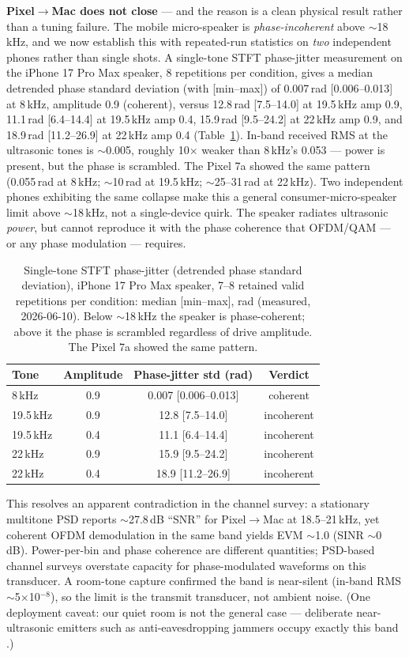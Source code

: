 \documentclass[11pt]{article}
\begin{document}
\textbf{Pixel$\rightarrow$Mac does not close} --- and the reason is a clean
physical result rather than a tuning failure. The mobile micro-speaker is
\emph{phase-incoherent} above $\sim$18\,kHz, and we now establish this with
repeated-run statistics on \emph{two} independent phones rather than single
shots. A single-tone STFT phase-jitter measurement on the iPhone 17 Pro Max
speaker, 8 repetitions per condition, gives a median detrended phase standard
deviation (with [min--max]) of 0.007\,rad [0.006--0.013] at 8\,kHz, amplitude
0.9 (coherent), versus 12.8\,rad [7.5--14.0] at 19.5\,kHz amp 0.9, 11.1\,rad
[6.4--14.4] at 19.5\,kHz amp 0.4, 15.9\,rad [9.5--24.2] at 22\,kHz amp 0.9, and
18.9\,rad [11.2--26.9] at 22\,kHz amp 0.4 (Table~\ref{tab:phase}). In-band
received RMS at the ultrasonic tones is $\sim$0.005, roughly 10$\times$ weaker
than 8\,kHz's 0.053 --- power is present, but the phase is scrambled. The Pixel
7a showed the same pattern (0.055\,rad at 8\,kHz; $\sim$10\,rad at 19.5\,kHz;
$\sim$25--31\,rad at 22\,kHz). Two independent phones exhibiting the same
collapse make this a general consumer-micro-speaker limit above $\sim$18\,kHz,
not a single-device quirk. The speaker radiates ultrasonic \emph{power}, but
cannot reproduce it with the phase coherence that OFDM/QAM --- or any phase
modulation --- requires.

\begin{table}[t]
\centering
\caption{Single-tone STFT phase-jitter (detrended phase standard deviation),
iPhone 17 Pro Max speaker, 7--8 retained valid repetitions per condition:
median [min--max], rad
(measured, 2026-06-10). Below $\sim$18\,kHz the speaker is phase-coherent;
above it the phase is scrambled regardless of drive amplitude. The Pixel 7a
showed the same pattern.}
\label{tab:phase}
\begin{tabular}{lccc}
\toprule
Tone & Amplitude & Phase-jitter std (rad) & Verdict \\
\midrule
8\,kHz    & 0.9 & 0.007 [0.006--0.013] & coherent \\
19.5\,kHz & 0.9 & 12.8 [7.5--14.0]     & incoherent \\
19.5\,kHz & 0.4 & 11.1 [6.4--14.4]     & incoherent \\
22\,kHz   & 0.9 & 15.9 [9.5--24.2]     & incoherent \\
22\,kHz   & 0.4 & 18.9 [11.2--26.9]    & incoherent \\
\bottomrule
\end{tabular}
\end{table} This
resolves an apparent contradiction in the channel survey: a stationary
multitone PSD reports $\sim$27.8\,dB ``SNR'' for Pixel$\rightarrow$Mac at
18.5--21\,kHz, yet coherent OFDM demodulation in the same band yields
EVM $\sim$1.0 (SINR $\sim$0\,dB). Power-per-bin and phase coherence are
different quantities; PSD-based channel surveys overstate capacity for
phase-modulated waveforms on this transducer. A room-tone capture confirmed
the band is near-silent (in-band RMS $\sim$5$\times$10$^{-8}$), so the limit is
the transmit transducer, not ambient noise. (One deployment caveat: our quiet
room is not the general case --- deliberate near-ultrasonic emitters such as
anti-eavesdropping jammers occupy exactly this band
\cite{nusguard,ultrajam}.)
\end{document}
